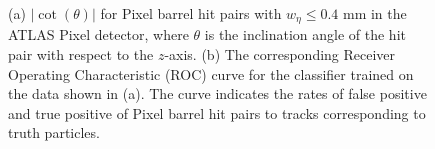 \begin{figure}[htbp!] 
    \centering
    \hfill%
    \caption{(a) $\lvert \cot(\theta) \rvert$ for Pixel barrel hit pairs with $w_{\eta} \leq 0.4$ mm in the ATLAS Pixel detector, where $\theta$ is the inclination angle of the hit pair with respect to the $z$-axis. (b) The corresponding Receiver Operating Characteristic (ROC) curve for the classifier trained on the data shown in (a). The curve indicates the rates of false positive and true positive of Pixel barrel hit pairs to tracks corresponding to truth particles.}
    \label{fig:1-dimensional-classifier-training}
\end{figure}


